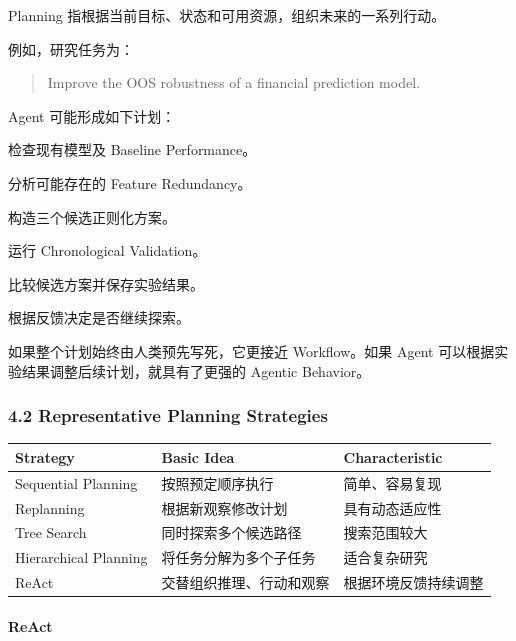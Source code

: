 Planning 指根据当前目标、状态和可用资源，组织未来的一系列行动。

例如，研究任务为：

\begin{quote}
Improve the OOS robustness of a financial prediction model.
\end{quote}

Agent 可能形成如下计划：

检查现有模型及 Baseline Performance。

分析可能存在的 Feature Redundancy。

构造三个候选正则化方案。

运行 Chronological Validation。

比较候选方案并保存实验结果。

根据反馈决定是否继续探索。

如果整个计划始终由人类预先写死，它更接近 Workflow。如果 Agent 可以根据实验结果调整后续计划，就具有了更强的 Agentic Behavior。

\hypertarget{part-3-34-0001-representative-planning-strategies}{%
\subsubsection{4.2 Representative Planning Strategies}\label{part-3-34-0001-representative-planning-strategies}}

\begin{readertable}
\begin{longtable}[]{@{}
  >{\raggedright\arraybackslash}p{}
  >{\raggedright\arraybackslash}p{}
  >{\raggedright\arraybackslash}p{}@{}}
\toprule
Strategy & Basic Idea & Characteristic \\
\midrule
\endhead
Sequential Planning & 按照预定顺序执行 & 简单、容易复现 \\
Replanning & 根据新观察修改计划 & 具有动态适应性 \\
Tree Search & 同时探索多个候选路径 & 搜索范围较大 \\
Hierarchical Planning & 将任务分解为多个子任务 & 适合复杂研究 \\
ReAct & 交替组织推理、行动和观察 & 根据环境反馈持续调整 \\
\bottomrule
\end{longtable}
\end{readertable}

\hypertarget{part-3-34-0001-react}{%
\paragraph{ReAct}\label{part-3-34-0001-react}}

